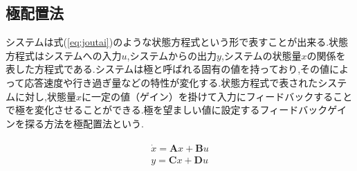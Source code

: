 \subsection{極配置法}システムは式(\ref{eq:joutai})のような状態方程式という形で表すことが出来る.状態方程式はシステムへの入力$u$,システムからの出力$y$,システムの状態量$x$の関係を表した方程式である.システムは極と呼ばれる固有の値を持っており,その値によって応答速度や行き過ぎ量などの特性が変化する.状態方程式で表されたシステムに対し,状態量$x$に一定の値（ゲイン）を掛けて入力にフィードバックすることで極を変化させることができる.極を望ましい値に設定するフィードバックゲインを探る方法を極配置法という.

\begin{eqnarray}
\begin{array}{l}
\dot{x}=\bm{A}x+\bm{B}u\\
y=\bm{C}x+\bm{D}u
\end{array}
\label{eq:joutai}
\end{eqnarray}
